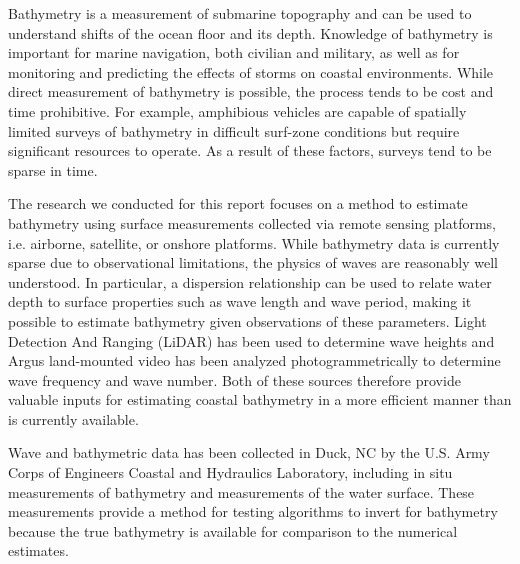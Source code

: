 Bathymetry is a measurement of submarine topography and can be used to understand shifts of the ocean floor and its depth. Knowledge of bathymetry is important for marine navigation, both civilian and military, as well as for monitoring and predicting the effects of storms on coastal environments. While direct measurement of bathymetry is possible, the process tends to be cost and time prohibitive. For example, amphibious vehicles are capable of spatially limited surveys of bathymetry in difficult surf-zone conditions but require significant resources to operate. As a result of these factors, surveys tend to be sparse in time. 

The research we conducted for this report focuses on a method to estimate bathymetry using surface measurements collected via remote sensing platforms, i.e. airborne, satellite, or onshore platforms. While bathymetry data is currently sparse due to observational limitations, the physics of waves are reasonably well understood. In particular, a dispersion relationship can be used to relate water depth to surface properties such as wave length and wave period, making it possible to estimate bathymetry given observations of these parameters. Light Detection And Ranging (LiDAR) has been used to determine wave heights and Argus land-mounted video has been analyzed photogrammetrically to determine wave frequency and wave number. Both of these sources therefore provide valuable inputs for estimating coastal bathymetry in a more efficient manner than is currently available.

Wave and bathymetric data has been collected in Duck, NC by the U.S. Army Corps of Engineers Coastal and Hydraulics Laboratory, including in situ measurements of bathymetry and measurements of the water surface. These measurements provide a method for testing algorithms to invert for bathymetry because the true bathymetry is available for comparison to the numerical estimates.

